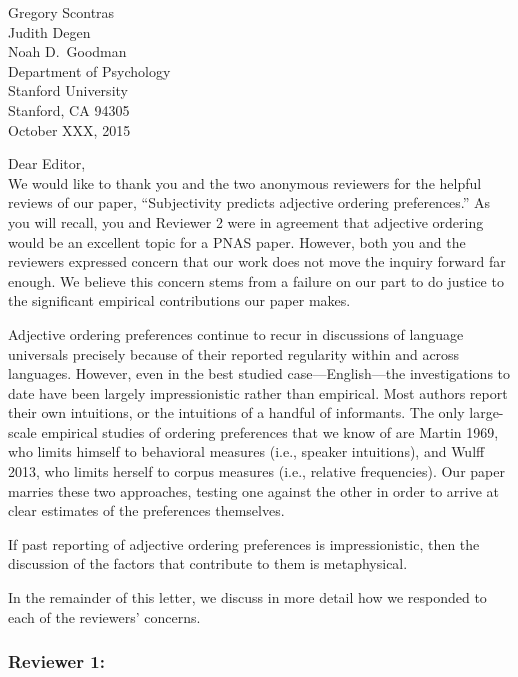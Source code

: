 \documentclass[12pt]{article}
\begin{document}
{\flushright

\vspace{25pt}
Gregory Scontras\\
Judith Degen\\
Noah D.~Goodman\\
Department of Psychology\\
Stanford University\\
Stanford, CA 94305\\[20pt]

\noindent October XXX, 2015\\[20pt]}


\noindent Dear Editor,\\

\noindent We would like to thank you and the two anonymous reviewers for the helpful reviews of our paper, ``Subjectivity predicts adjective ordering preferences.'' As you will recall, you and Reviewer 2 were in agreement that adjective ordering would be an excellent topic for a PNAS paper. However, both you and the reviewers expressed concern that our work does not move the inquiry forward far enough. We believe this concern stems from a failure on our part to do justice to the significant empirical contributions our paper makes.

Adjective ordering preferences continue to recur in discussions of language universals precisely because of their reported regularity within and across languages. However, even in the best studied case---English---the investigations to date have been largely impressionistic rather than empirical. Most authors report their own intuitions, or the intuitions of a handful of informants. The only large-scale empirical studies of ordering preferences that we know of are Martin 1969, who limits himself to behavioral measures (i.e., speaker intuitions), and Wulff 2013, who limits herself to corpus measures (i.e., relative frequencies). Our paper marries these two approaches, testing one against the other in order to arrive at clear estimates of the  preferences themselves.

If past reporting of adjective ordering preferences is impressionistic, then the discussion of the factors that contribute to them is metaphysical.

In the remainder of this letter, we discuss in more detail how we responded to each of the reviewers' concerns.


\subsubsection*{Reviewer 1:}
\end{document}
